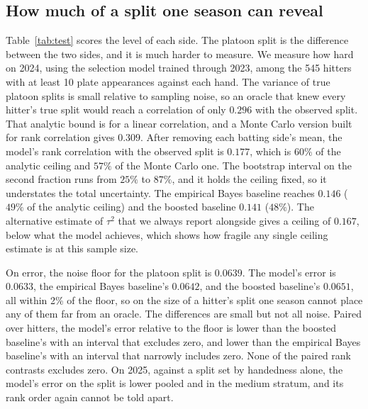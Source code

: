 \documentclass[11pt,letterpaper]{article}
\begin{document}
\subsection{How much of a split one season can reveal}
\label{sec:ceiling}

Table~\ref{tab:test} scores the level of each side. The platoon split is the difference between the two sides, and it is much harder to measure. We measure how hard on 2024, using the selection model trained through 2023, among the 545 hitters with at least 10 plate appearances against each hand. The variance of true platoon splits is small relative to sampling noise, so an oracle that knew every hitter's true split would reach a correlation of only $0.296$ with the observed split. That analytic bound is for a linear correlation, and a Monte Carlo version built for rank correlation gives $0.309$. After removing each batting side's mean, the model's rank correlation with the observed split is $0.177$, which is $60\%$ of the analytic ceiling and $57\%$ of the Monte Carlo one. The bootstrap interval on the second fraction runs from $25\%$ to $87\%$, and it holds the ceiling fixed, so it understates the total uncertainty. The empirical Bayes baseline reaches $0.146$ ($49\%$ of the analytic ceiling) and the boosted baseline $0.141$ ($48\%$). The alternative estimate of $\tau^2$ that we always report alongside gives a ceiling of $0.167$, below what the model achieves, which shows how fragile any single ceiling estimate is at this sample size.

On error, the noise floor for the platoon split is $0.0639$. The model's error is $0.0633$, the empirical Bayes baseline's $0.0642$, and the boosted baseline's $0.0651$, all within 2\% of the floor, so on the size of a hitter's split one season cannot place any of them far from an oracle. The differences are small but not all noise. Paired over hitters, the model's error relative to the floor is lower than the boosted baseline's with an interval that excludes zero, and lower than the empirical Bayes baseline's with an interval that narrowly includes zero. None of the paired rank contrasts excludes zero. On 2025, against a split set by handedness alone, the model's error on the split is lower pooled and in the medium stratum, and its rank order again cannot be told apart.
\end{document}
